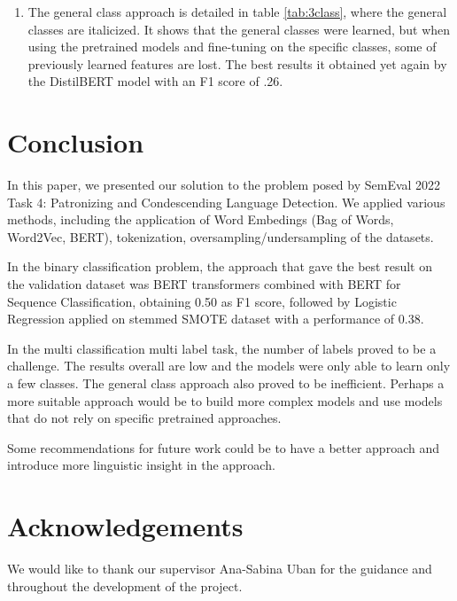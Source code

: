 \documentclass[11pt]{article}
\begin{document}
\begin{enumerate}
\begin{enumerate}
              \item The general class approach is detailed in table
                  \ref{tab:3class}, where the general classes are italicized.
                  It shows that the general classes were learned, but when
                  using the pretrained models and fine-tuning on the specific
                  classes, some of previously learned features are lost. The
                  best results it obtained yet again by the DistilBERT model
                  with an F1 score of .26.


	      \end{enumerate}
\end{enumerate}


\section{Conclusion}

In this paper, we presented our solution to the problem posed by SemEval 2022 Task
4: Patronizing and Condescending Language Detection. We applied
various methods, including the application of Word Embedings (Bag of Words,
Word2Vec, BERT), tokenization, oversampling/undersampling of the datasets.

In the binary classification problem, the approach that gave the best result
on the validation dataset was BERT transformers combined with BERT for
Sequence Classification, obtaining 0.50 as F1 score, followed by Logistic
Regression applied on stemmed SMOTE dataset with a performance of 0.38.

In the multi classification multi label task, the number of labels proved to
be a challenge. The results overall are low and the models were only able to learn
only a few classes. The general class approach also proved to be inefficient.
Perhaps a more suitable approach would be to build more complex models and use
models that do not rely on specific pretrained approaches.

Some recommendations for future work could be to have a better approach and introduce
more linguistic insight in the approach.

\section*{Acknowledgements}

We would like to thank our supervisor Ana-Sabina Uban for the guidance and throughout
the development of the project.




\end{document}
